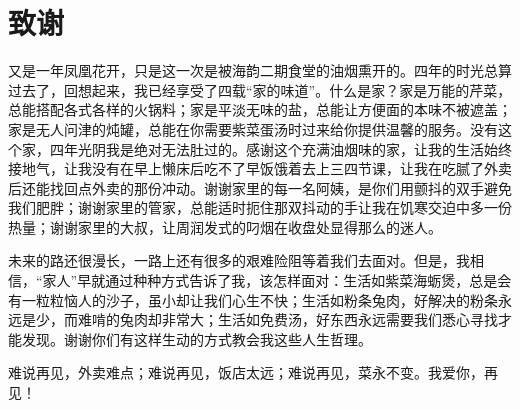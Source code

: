 \documentclass[a4paper,12pt]{book} %
\begin{document}
\makeatletter
\newcommand\engcontentsname{Contents}
\newcommand\tableofengcontents{%
    \if@twocolumn
      \@restonecoltrue\onecolumn
    \else
      \@restonecolfalse
    \fi
    \chapter*{\engcontentsname
        \@mkboth{%
           \MakeUppercase\engcontentsname}{\MakeUppercase\engcontentsname}}%
    \@starttoc{toe}%
    \if@restonecol\twocolumn\fi
    }
\newcommand\addengcontents[2]{%
    \addcontentsline{toe}{#1}{\protect\numberline{\csname the#1\endcsname}#2}}
\makeatother

\newcommand\echapter[1]{\addengcontents{chapter}{#1}}
\newcommand\esection[1]{\addengcontents{section}{#1}}
\newcommand\esubsection[1]{\addengcontents{subsection}{#1}}


\frontmatter
{}


\chapter*{致谢}
\thispagestyle{plain}

又是一年凤凰花开，只是这一次是被海韵二期食堂的油烟熏开的。四年的时光总算过去了，回想起来，我已经享受了四载“家的味道”。什么是家？家是万能的芹菜，总能搭配各式各样的火锅料；家是平淡无味的盐，总能让方便面的本味不被遮盖；家是无人问津的炖罐，总能在你需要紫菜蛋汤时过来给你提供温馨的服务。没有这个家，四年光阴我是绝对无法肚过的。感谢这个充满油烟味的家，让我的生活始终接地气，让我没有在早上懒床后吃不了早饭饿着去上三四节课，让我在吃腻了外卖后还能找回点外卖的那份冲动。谢谢家里的每一名阿姨，是你们用颤抖的双手避免我们肥胖；谢谢家里的管家，总能适时扼住那双抖动的手让我在饥寒交迫中多一份热量；谢谢家里的大叔，让周润发式的叼烟在收盘处显得那么的迷人。

未来的路还很漫长，一路上还有很多的艰难险阻等着我们去面对。但是，我相信，“家人”早就通过种种方式告诉了我，该怎样面对：生活如紫菜海蛎煲，总是会有一粒粒恼人的沙子，虽小却让我们心生不快；生活如粉条兔肉，好解决的粉条永远是少，而难啃的兔肉却非常大；生活如免费汤，好东西永远需要我们悉心寻找才能发现。谢谢你们有这样生动的方式教会我这些人生哲理。

难说再见，外卖难点；难说再见，饭店太远；难说再见，菜永不变。我爱你，再见！\\
\end{document}

